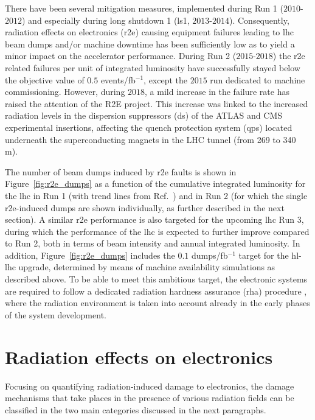 \documentclass[encoding=utf8,british]{tumphthesis}
\begin{document}
There have been several mitigation measures, implemented during Run 1 ($2010$-$2012$) and especially during long shutdown 1 (\acrshort{ls}1, $2013$-$2014$). Consequently, radiation effects on electronics (\acrshort{r2e}) causing equipment failures leading to \acrshort{lhc} beam dumps and/or machine downtime has been sufficiently low as to yield a minor impact on the accelerator performance. During Run 2 ($2015$-$2018$) the \acrshort{r2e} related failures per unit of integrated luminosity have successfully stayed  below the objective value of $0.5$ events/fb$^{-1}$, except the $2015$ run dedicated to machine commissioning. However, during $2018$, a mild increase in the failure rate has raised the attention of the R2E project. This increase was linked to the increased radiation levels in the dispersion suppressors (\acrshort{ds}) of the ATLAS and CMS experimental insertions, affecting the quench protection system (\acrshort{qps}) located underneath the superconducting magnets in the LHC tunnel (from 269 to 340 m)\cite{Aguiar:IPAC2021}.

The number of beam dumps induced by \acrshort{r2e} faults is shown in Figure~\ref{fig:r2e_dumps} as a function of the cumulative integrated luminosity for the \acrshort{lhc} in Run 1 (with trend lines from Ref.~\cite{brugger2014chamonix}) and in Run 2 (for which the single \acrshort{r2e}-induced dumps are shown individually, as further described in the next section). A similar \acrshort{r2e} performance is also targeted for the upcoming \acrshort{lhc} Run 3, during which the performance of the \acrshort{lhc} is expected to further improve compared to Run 2, both in terms of beam intensity and annual integrated luminosity. In addition, Figure~\ref{fig:r2e_dumps} includes the $0.1$ dumps/fb$^{-1}$ target for the \acrshort{hl-lhc} upgrade, determined by means of machine availability simulations as described above. To be able to meet this ambitious target, the electronic systems are required to follow a dedicated radiation hardness assurance (\acrshort{rha}) procedure \cite{Uznanski:2765495, GarcíaAlía:2310128}, where the radiation environment is taken into account already in the early phases of the system development.

\section{Radiation effects on electronics}
\label{sec:radiation-effects-on-electronics}

Focusing on quantifying radiation-induced damage to electronics, the damage mechanisms that take places in the presence of various radiation fields can be classified in the two main categories discussed in the next paragraphs.
\end{document}
